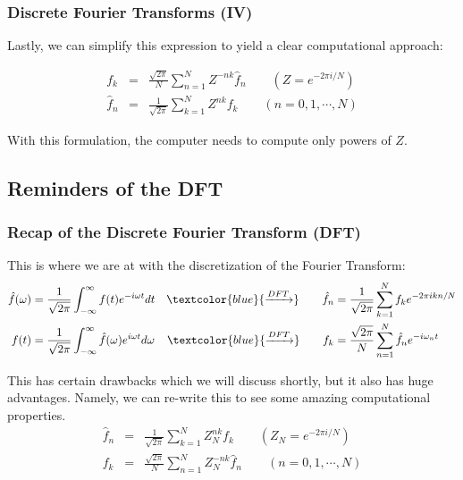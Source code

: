 \documentclass[hyperref={colorlinks=true}]{beamer}
\begin{document}

\begin{frame}%
  \frametitle{Discrete Fourier Transforms (IV)}

  Lastly, we can simplify this expression to yield a clear computational approach:
      
  \begin{eqnarray}
    f_k       &=& \frac{\sqrt{2\pi}}{N} \sum_{n=1}^{N} Z^{-nk}\hat{f}_{n} \qquad (Z=e^{-2\pi i/N}) \\
    \hat{f}_n &=& \frac{1}{\sqrt{2\pi}} \sum_{k=1}^{N} Z^{nk} f_k \qquad (n=0,1,\cdots,N) 
  \end{eqnarray}
  
  With this formulation, the computer needs to compute only powers of $Z$.
  
\end{frame}


\subsection[Recap of the DFT]{Reminders of the DFT}

\begin{frame}%
  \frametitle{Recap of the Discrete Fourier Transform (DFT)}

  This is where we are at with the discretization of the Fourier Transform:
  \begin{align}
    \hat{f}(\omega) &=   \frac{1}{\sqrt{2\pi}} \int_{-\infty}^{\infty} f(t) e^{-i\omega t} dt %
      &\textcolor{blue}{\xrightarrow{DFT}} \qquad \hat{f}_n &= \frac{1}{\sqrt{2\pi}} \sum_{k=1}^{N}  f_k  e^{-2\pi i k n/N}  \\
    f(t)            &=   \frac{1}{\sqrt{2\pi}} \int_{-\infty}^{\infty} \hat{f}(\omega) e^{i \omega t } d\omega %
      &\textcolor{blue}{\xrightarrow{DFT}} \qquad f_k &= \frac{\sqrt{2\pi}}{N} \sum_{n=1}^{N} \hat{f}_n  e^{-i\omega_n t}
  \end{align}

  This has certain drawbacks which we will discuss shortly, but it also has huge advantages. Namely, we can re-write this to see some amazing computational properties.
  \begin{eqnarray}
    \hat{f}_n &=& \frac{1}{\sqrt{2\pi}} \sum_{k=1}^{N} Z_{N}^{nk} f_k \qquad (Z_{N}=e^{-2\pi i/N}) \label{eq:simple-ft}\\
    f_k       &=& \frac{\sqrt{2\pi}}{N} \sum_{n=1}^{N} Z_{N}^{-nk}\hat{f}_{n}  \qquad (n=0,1,\cdots,N)  \label{eq:simple-ift}
  \end{eqnarray}

\end{frame}
\end{document}

